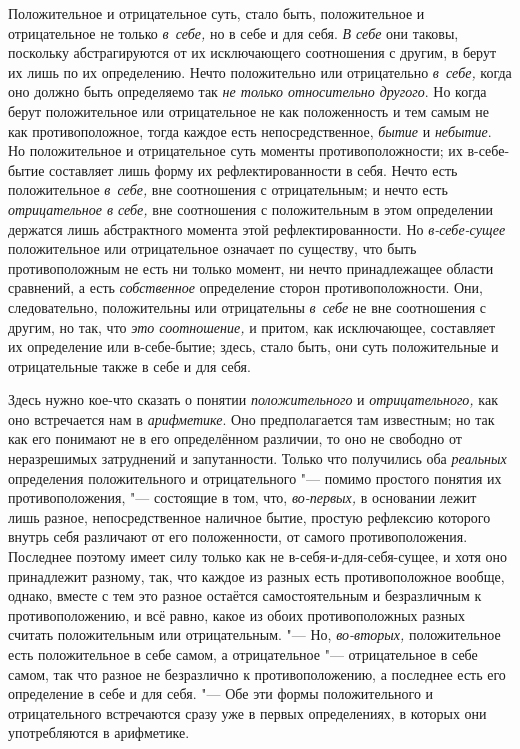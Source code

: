 Положительное и отрицательное суть, стало быть, положительное и
отрицательное не только {\em в~себе,} но в себе и для
себя. {\em В себе} они таковы, поскольку абстрагируются
от их исключающего соотношения с другим, в берут их лишь по их определению.
Нечто положительно или отрицательно {\em в~себе,} когда
оно должно быть определяемо так {\em не только
относительно другого}. Но когда берут положительное или отрицательное не
как положенность и тем самым не как противоположное, тогда каждое есть
непосредственное, {\em бытие} и
{\em небытие}. Но положительное и отрицательное суть
моменты противоположности; их в-себе-бытие составляет лишь форму их
рефлектированности в себя. Нечто есть положительное
{\em в~себе,} вне соотношения с отрицательным; и нечто
есть {\em отрицательное в себе,} вне соотношения с
положительным
в этом определении держатся лишь абстрактного момента этой
рефлектированности. Но {\em в-себе-сущее} положительное
или отрицательное означает по существу, что быть противоположным не есть ни
только момент, ни нечто принадлежащее области сравнений, а есть
{\em собственное} определение сторон противоположности.
Они, следовательно, положительны или отрицательны
{\em в~себе} не вне соотношения с другим, но так, что
{\em это соотношение,} и притом, как исключающее,
составляет их определение или в-себе-бытие; здесь, стало быть, они суть
положительные и отрицательные также в себе и для себя.


Здесь нужно кое-что сказать о понятии {\em положительного} и
{\em отрицательного,} как оно встречается нам в
{\em арифметике}. Оно предполагается там известным; но
так как его понимают не в его определённом различии, то оно не свободно от
неразрешимых затруднений и запутанности. Только что получились оба
{\em реальных} определения положительного и
отрицательного "--- помимо простого понятия их противоположения,
"--- состоящие в том, что, {\em во-первых,} в основании лежит лишь
разное, непосредственное наличное бытие, простую рефлексию которого внутрь
себя различают от его положенности, от самого противоположения. Последнее
поэтому имеет силу только как не в-себя-и-для-себя-сущее, и хотя оно
принадлежит разному, так, что каждое из разных есть противоположное вообще,
однако, вместе с тем это разное остаётся самостоятельным и безразличным к
противоположению, и всё равно, какое из обоих противоположных разных
считать положительным или отрицательным. "--- Но,
{\em во-вторых,} положительное есть положительное в
себе самом, а отрицательное "--- отрицательное в себе самом, так что разное не
безразлично к противоположению, а последнее есть его определение в себе и
для себя. "--- Обе эти формы положительного и отрицательного встречаются сразу
уже в первых определениях, в которых они употребляются в арифметике.

